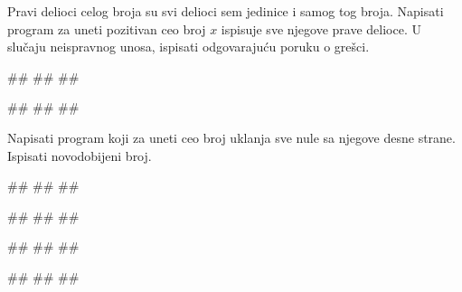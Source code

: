 \begin{Exercise}[label=PET_08] 
Pravi delioci celog broja su svi delioci sem jedinice i samog tog
broja. Napisati program za uneti pozitivan ceo broj $x$
ispisuje sve njegove prave delioce.
U slučaju neispravnog unosa, ispisati odgovarajuću poruku o grešci.

\begin{miditest}
\begin{upotreba}{1}
#\naslovInt#
##
##
\end{upotreba}
\end{miditest}
\begin{miditest}
\begin{upotreba}{2}
#\naslovInt#
##
##
\end{upotreba}
\end{miditest}
\end{Exercise}
\ifresenja
\begin{Answer}[ref=PET_08]
\end{Answer}
\fi


\begin{Exercise}[label=PET_09] 
 Napisati program koji za uneti ceo broj uklanja sve nule
 sa njegove desne strane. Ispisati novodobijeni broj. 
 
\begin{miditest}
\begin{upotreba}{1}
#\naslovInt#
##
##
\end{upotreba}
\end{miditest}
\begin{miditest}
\begin{upotreba}{2}
#\naslovInt#
##
##
\end{upotreba}
\end{miditest}

\begin{miditest}
\begin{upotreba}{3}
#\naslovInt#
##
##
\end{upotreba}
\end{miditest}
\begin{miditest}
\begin{upotreba}{4}
#\naslovInt#
##
##
\end{upotreba}
\end{miditest}

\end{Exercise}
\ifresenja
\begin{Answer}[ref=PET_09]
\end{Answer}
\fi


